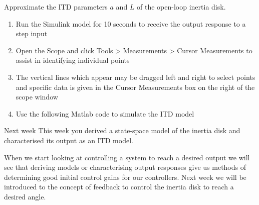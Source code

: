 \documentclass[9pt]{beamer-control}
\begin{document}
\begin{frame}
	Approximate the ITD parameters $a$ and $L$ of the open-loop inertia disk.
	\begin{enumerate}
		\item Run the Simulink model for 10 seconds to receive the output response to a step input
		\item Open the Scope and click Tools > Measurements > Cursor Measurements to assist in identifying individual points
		\item The vertical lines which appear may be dragged left and right to select points and specific data is given in the Cursor Measurements box on the right of the scope window
		\item Use the following Matlab code to simulate the ITD model
		\end{enumerate}
\end{frame}


\begin{frame}{Next week}
	This week you derived a state-space model of the inertia disk and characterised its output as an ITD model.
		
	When we start looking at controlling a system to reach a desired output we will see that deriving models or characterising output responses give us methods of determining good initial control gains for our controllers. Next week we will be introduced to the concept of feedback to control the inertia disk to reach a desired angle. 
\end{frame}
\end{document}
